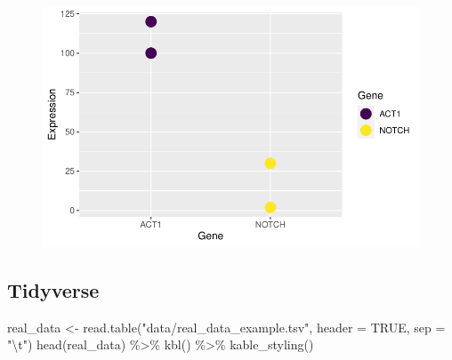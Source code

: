 \documentclass[
  letterpaper,
  DIV=11,
  numbers=noendperiod,
  landscape]{scrartcl}
\newenvironment{Shaded}{\begin{snugshade}}{\end{snugshade}}
\newcommand{\AttributeTok}[1]{\textcolor[rgb]{0.40,0.45,0.13}{#1}}
\newcommand{\ConstantTok}[1]{\textcolor[rgb]{0.56,0.35,0.01}{#1}}
\newcommand{\FunctionTok}[1]{\textcolor[rgb]{0.28,0.35,0.67}{#1}}
\newcommand{\NormalTok}[1]{\textcolor[rgb]{0.00,0.23,0.31}{#1}}
\newcommand{\OtherTok}[1]{\textcolor[rgb]{0.00,0.23,0.31}{#1}}
\newcommand{\SpecialCharTok}[1]{\textcolor[rgb]{0.37,0.37,0.37}{#1}}
\newcommand{\StringTok}[1]{\textcolor[rgb]{0.13,0.47,0.30}{#1}}
\begin{document}
\begin{figure}[H]

{\centering \includegraphics{RandRStudio_files/figure-pdf/unnamed-chunk-22-1.pdf}

}

\end{figure}

\newpage

\hypertarget{tidyverse-4}{%
\subsection{Tidyverse}\label{tidyverse-4}}

\begin{Shaded}
\begin{Highlighting}[]
\NormalTok{real\_data }\OtherTok{\textless{}{-}} \FunctionTok{read.table}\NormalTok{(}\StringTok{"data/real\_data\_example.tsv"}\NormalTok{, }\AttributeTok{header =} \ConstantTok{TRUE}\NormalTok{, }\AttributeTok{sep =} \StringTok{"}\SpecialCharTok{\textbackslash{}t}\StringTok{"}\NormalTok{)}
\FunctionTok{head}\NormalTok{(real\_data)  }\SpecialCharTok{\%\textgreater{}\%}
  \FunctionTok{kbl}\NormalTok{() }\SpecialCharTok{\%\textgreater{}\%}
  \FunctionTok{kable\_styling}\NormalTok{()}
\end{Highlighting}
\end{Shaded}
\end{document}
